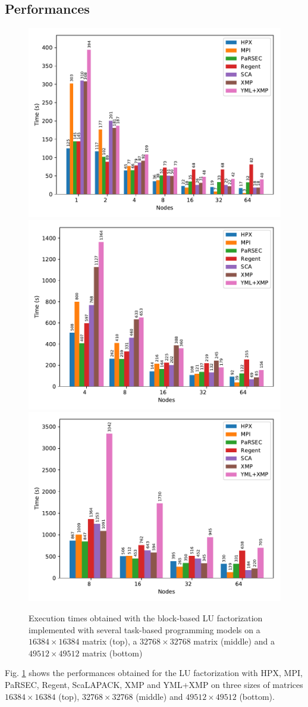 \subsection{Performances}
\begin{figure}[h]
	\centering
	\includegraphics[width=.6\linewidth]{fig_strong_scaling_bar_task}
	\includegraphics[width=.6\linewidth]{fig_strong_scaling_bar_task_32k}
	\includegraphics[width=.6\linewidth]{fig_strong_scaling_bar_task_49k}
	\caption{Execution times obtained with the block-based LU factorization implemented with several task-based programming models on a $16384 \times 16384$ matrix (top), a $32768 \times 32768$ matrix (middle) and a $49512 \times 49512$ matrix (bottom)\label{fig:perf}}
\end{figure}


Fig. \ref{fig:perf} shows the performances obtained for the LU factorization with HPX, MPI, PaRSEC, Regent, ScaLAPACK, XMP and YML+XMP on three sizes of matrices $16384 \times 16384$ (top), $32768 \times 32768$ (middle) and $49512 \times 49512$ (bottom).

